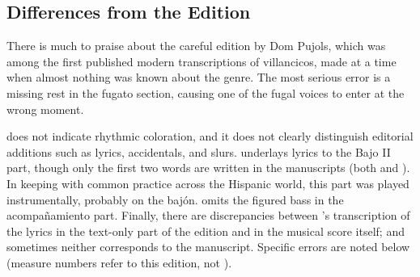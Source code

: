 \subsection*{
Differences from the  Edition}

There is much to praise about the careful edition by Dom Pujols, which was among the first published modern transcriptions of villancicos, made at a time when almost nothing was known about the genre.
The most serious error is a missing rest in the fugato section, causing one of the fugal voices to enter at the wrong moment.

 does not indicate rhythmic coloration, and it does not clearly distinguish editorial additions such as lyrics, accidentals, and slurs.
 underlays lyrics to the Bajo II part, though only the first two words are written in the manuscripts (both  and ).
In keeping with common practice across the Hispanic world, this part was played instrumentally, probably on the bajón.
 omits the figured bass in the acompañamiento part.
Finally, there are discrepancies between 's transcription of the lyrics in the text-only part of the edition and in the musical score itself; and sometimes neither corresponds to the manuscript.
Specific errors are noted below (measure numbers refer to this edition, not ).

